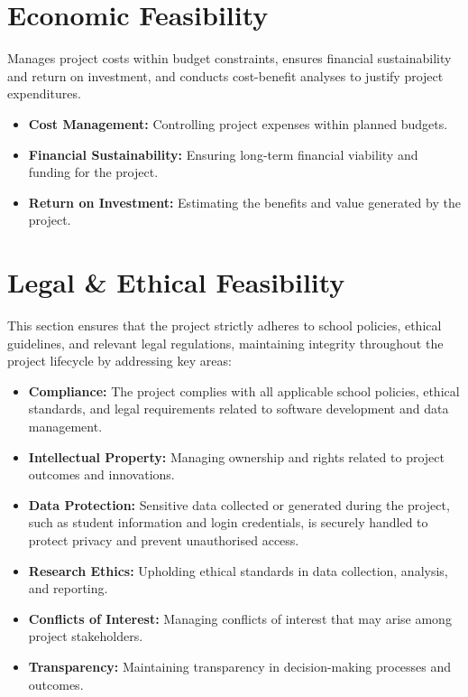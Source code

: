 \documentclass[12pt, a4paper]{report}
\begin{document}
\section{Economic Feasibility}

Manages project costs within budget constraints, ensures financial sustainability and return on investment, and conducts cost-benefit analyses to justify project expenditures.

\begin{itemize}
    \item \textbf{Cost Management:} Controlling project expenses within planned budgets.
    \item \textbf{Financial Sustainability:} Ensuring long-term financial viability and funding for the project.
    \item \textbf{Return on Investment:} Estimating the benefits and value generated by the project.
\end{itemize}

\section{Legal \& Ethical Feasibility}

This section ensures that the project strictly adheres to school policies, ethical guidelines, and relevant legal regulations, maintaining integrity throughout the project lifecycle by addressing key areas:

\begin{itemize}
    \item \textbf{Compliance:} The project complies with all applicable school policies, ethical standards, and legal requirements related to software development and data management.
    \item \textbf{Intellectual Property:} Managing ownership and rights related to project outcomes and innovations.
    \item \textbf{Data Protection:} Sensitive data collected or generated during the project, such as student information and login credentials, is securely handled to protect privacy and prevent unauthorised access.
    \item \textbf{Research Ethics:} Upholding ethical standards in data collection, analysis, and reporting.
    \item \textbf{Conflicts of Interest:} Managing conflicts of interest that may arise among project stakeholders.
    \item \textbf{Transparency:} Maintaining transparency in decision-making processes and outcomes.
\end{itemize}
\end{document}
